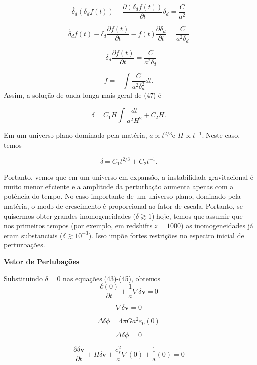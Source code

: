 \documentclass[a4paper,12pt]{article}
\begin{document}
$$\dot{\delta_d} (\delta_d f(t)) - \dfrac{\partial(\delta_d f(t))}{\partial t} \delta_d = \dfrac{C}{a^2}$$

$$\dot{\delta_d}f(t) - \delta_d\dfrac{\partial f(t)}{\partial t} -f(t)\dfrac{\partial\delta_d }{\partial t}= \dfrac{C}{a^2\delta_d}$$

$$- \delta_d\dfrac{\partial f(t)}{\partial t} = \dfrac{C}{a^2\delta_d}$$

\begin{equation}
	f = - \int \dfrac{C}{a^2\delta_d^2}dt.
\end{equation}
Assim, a solução de onda longa mais geral de (47) é

\begin{equation}
	\delta = C_1 H \int \dfrac{dt}{a^2H^2} + C_2 H.
\end{equation}

Em um universo plano dominado pela matéria, $a \propto t^{2/3}$e $H \propto t^{-1}$. Neste caso, temos

\begin{equation}
	\delta = C_1 t^{2/3} + C_2 t^{-1}.
\end{equation}

Portanto, vemos que em um universo em expansão, a instabilidade gravitacional é muito menor
eficiente e a amplitude da perturbação aumenta apenas com a potência do tempo. No caso importante de um universo plano, dominado pela matéria, o modo de crescimento é proporcional
ao fator de escala. Portanto, se quisermos obter grandes inomogeneidades ($\delta \gtrsim 1$) hoje, temos que assumir que nos primeiros tempos (por exemplo, em redshifts $z = 1000$)
as inomogeneidades já eram substanciais ($\delta \gtrsim 10^{-3}$). Isso impõe fortes
restrições no espectro inicial de perturbações.
\newline

\begin{center}
	\textbf{Vetor de Pertubações}
\end{center}
Substituindo $\delta =0 $ nas equações (43)-(45), obtemos
$$\dfrac{\partial (0)}{\partial t} + \dfrac{1}{a}\nabla\delta\mathbf{v} = 0$$

$$\nabla\delta\mathbf{v} = 0$$
\newline

$$\Delta\delta\phi = 4\pi Ga^2\varepsilon_0 (0)$$

$$\Delta\delta\phi = 0$$
\newline

$$\dfrac{\partial\delta\mathbf{v}}{\partial t} + H\delta\mathbf{v} + \dfrac{c^2_s}{a}\nabla(0) +\dfrac{1}{a}(0) = 0$$
\end{document}
